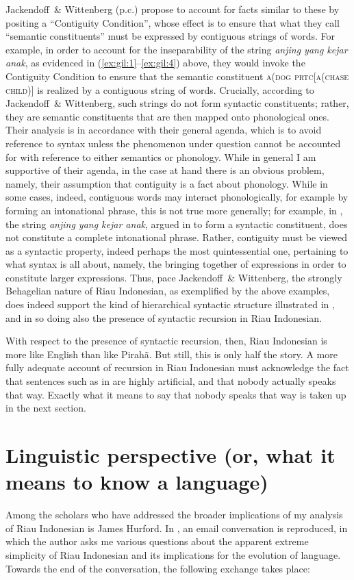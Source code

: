 \documentclass[output=paper,colorlinks,citecolor=brown
]{langscibook}
\begin{document}
Jackendoff~\& Wittenberg (p.c.) propose to account for facts similar to these by positing a ``Contiguity Condition'', whose effect is to ensure that what they call ``semantic constituents'' must be expressed by contiguous strings of words.  For example, in order to account for the inseparability of the string \textit{anjing yang kejar anak}, as evidenced in (\ref{ex:gil:1}--\ref{ex:gil:4}) above, they would invoke the Contiguity Condition to ensure that the semantic constituent \textsc{a(dog prtc[a(chase child)]} is realized by a contiguous string of words.  Crucially, according to Jackendoff~\& Wittenberg, such strings do not form syntactic constituents; rather, they are semantic constituents that are then mapped onto phonological ones.  Their analysis is in accordance with their general agenda, which is to avoid reference to syntax unless the phenomenon under question cannot be accounted for with reference to either semantics or phonology.  While in general I am supportive of their agenda, in the case at hand there is an obvious problem, namely, their assumption that contiguity is a fact about phonology.  While in some cases, indeed, contiguous words may interact phonologically, for example by forming an intonational phrase, this is not true more generally; for example, in , the string \textit{anjing yang kejar anak}, argued in  to form a syntactic constituent, does not constitute a complete intonational phrase.  Rather, contiguity must be viewed as a syntactic property, indeed perhaps the most quintessential one, pertaining to what syntax is all about, namely, the bringing together of expressions in order to constitute larger expressions.  Thus, pace Jackendoff~\& Wittenberg, the strongly Behagelian nature of Riau Indonesian, as exemplified by the above examples, does indeed support the kind of hierarchical syntactic structure illustrated in , and in so doing also the presence of syntactic recursion in Riau Indonesian.

With respect to the presence of syntactic recursion, then, Riau Indonesian is more like English than like Pirahã.  But still, this is only half the story.  A more fully adequate account of recursion in Riau Indonesian must acknowledge the fact that sentences such as in  are highly artificial, and that nobody actually speaks that way.  Exactly what it means to say that nobody speaks that way is taken up in the next section.

\section{Linguistic perspective (or, what it means to know a language)}
Among the scholars who have addressed the broader implications of my analysis of Riau Indonesian is James Hurford. In \citet[410--413]{hurford2011origins}, an email conversation is reproduced, in which the author asks me various questions about the apparent extreme simplicity of Riau Indonesian and its implications for the evolution of language.  Towards the end of the conversation, the following exchange takes place:
\end{document}
